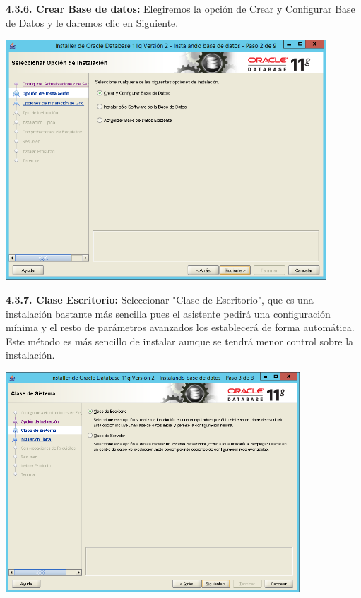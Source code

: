 \textbf {4.3.6. Crear Base de datos:} Elegiremos la opción de Crear y Configurar Base de Datos y le daremos clic en Siguiente.
\begin{center}
  \includegraphics[width=12cm]{Imagenes/Opcion_Crear_Base.png}
\end{center}
\break

\textbf {4.3.7. Clase Escritorio:} Seleccionar "Clase de Escritorio", que es una instalación bastante más sencilla pues el asistente pedirá una configuración mínima y el resto de parámetros avanzados los establecerá de forma automática. Este método es más sencillo de instalar aunque se tendrá menor control sobre la instalación.
\begin{center}
  \includegraphics[width=11cm]{Imagenes/Opcion_Crear_Escritorio.png}
\end{center}

